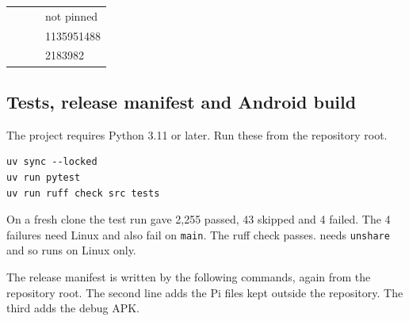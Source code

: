 \begin{table}[t]
\begin{tabularx}{\linewidth}{>{\raggedright\arraybackslash}p{2.9cm}>{\raggedright\arraybackslash}p{4.3cm}Y>{\raggedleft\arraybackslash}p{1.9cm}}
\addlinespace[1pt]
\allowbreak{}\allowbreak{}\allowbreak{} & \allowbreak{}\allowbreak{}\allowbreak{}\allowbreak{}\allowbreak{}\allowbreak{} & \allowbreak{}\allowbreak{}\allowbreak{} & not pinned \\
\addlinespace[1pt]
\allowbreak{}\allowbreak{} & \allowbreak{}\allowbreak{}\allowbreak{}\allowbreak{}\allowbreak{}\allowbreak{}\allowbreak{}\allowbreak{} & \allowbreak{}\allowbreak{}\allowbreak{} & \num{1135951488} \\
\addlinespace[1pt]
\allowbreak{}\allowbreak{}\allowbreak{} & \allowbreak{}\allowbreak{}\allowbreak{}\allowbreak{}\allowbreak{} & \allowbreak{}\allowbreak{}\allowbreak{} & \num{2183982} \\
\bottomrule
\end{tabularx}
\end{table}

\subsection{Tests, release manifest and Android build}

The project requires Python 3.11 or later. Run these from the repository root.

\begin{verbatim}
uv sync --locked
uv run pytest
uv run ruff check src tests
\end{verbatim}

On a fresh clone the test run gave 2,255 passed, 43 skipped and 4 failed. The 4 failures need Linux and also fail on \texttt{main}. The ruff check passes.  needs \texttt{unshare} and so runs on Linux only.

The release manifest is written by the following commands, again from the repository root. The second line adds the Pi files kept outside the repository. The third adds the debug APK.

